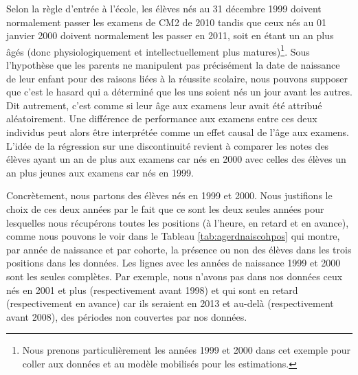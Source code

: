 \documentclass[
]{book}
\begin{document}
\quad Selon la règle d'entrée à l'école, les élèves nés au 31 décembre 1999 doivent normalement passer les examens de CM2 de 2010 tandis que ceux nés au 01 janvier 2000 doivent normalement les passer en 2011, soit en étant un an plus âgés (donc physiologiquement et intellectuellement plus matures)\footnote{Nous prenons particulièrement les années 1999 et 2000 dans cet exemple pour coller aux données et au modèle mobilisés pour les estimations.}. Sous l'hypothèse que les parents ne manipulent pas précisément la date de naissance de leur enfant pour des raisons liées à la réussite scolaire, nous pouvons supposer que c'est le hasard qui a déterminé que les uns soient nés un jour avant les autres. Dit autrement, c'est comme si leur âge aux examens leur avait été attribué aléatoirement. Une différence de performance aux examens entre ces deux individus peut alors être interprétée comme un effet causal de l'âge aux examens. L'idée de la régression sur une discontinuité revient à comparer les notes des élèves ayant un an de plus aux examens car nés en 2000 avec celles des élèves un an plus jeunes aux examens car nés en 1999.

\quad Concrètement, nous partons des élèves nés en 1999 et 2000. Nous justifions le choix de ces deux années par le fait que ce sont les deux seules années pour lesquelles nous récupérons toutes les positions (à l'heure, en retard et en avance), comme nous pouvons le voir dans le Tableau \ref{tab:agerdnaiscohpos} qui montre, par année de naissance et par cohorte, la présence ou non des élèves dans les trois positions dans les données. Les lignes avec les années de naissance 1999 et 2000 sont les seules complètes. Par exemple, nous n'avons pas dans nos données ceux nés en 2001 et plus (respectivement avant 1998) et qui sont en retard (respectivement en avance) car ils seraient en 2013 et au-delà (respectivement avant 2008), des périodes non couvertes par nos données.

\begingroup\fontsize{8}{10}\selectfont
\end{document}
